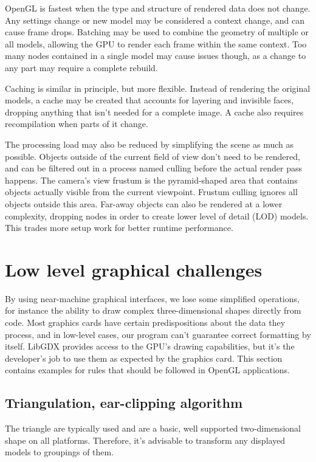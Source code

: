 OpenGL is fastest when the type and structure of rendered data does not change. Any settings change or new model may be considered a context change, and can cause frame drops. Batching may be used to combine the geometry of multiple or all models, allowing the GPU to render each frame within the same context. Too many nodes contained in a single model may cause issues though, as a change to any part may require a complete rebuild.

Caching is similar in principle, but more flexible. Instead of rendering the original models, a cache may be created that accounts for layering and invisible faces, dropping anything that isn't needed for a complete image. A cache also requires recompilation when parts of it change.

The processing load may also be reduced by simplifying the scene as much as possible. Objects outside of the current field of view don't need to be rendered, and can be filtered out in a process named culling before the actual render pass happens. The camera's view frustum is the pyramid-shaped area that contains objects actually visible from the current viewpoint. Frustum culling ignores all objects outside this area. Far-away objects can also be rendered at a lower complexity, dropping nodes in order to create lower level of detail (LOD) models. This trades more setup work for better runtime performance.

\section{Low level graphical challenges}

By using near-machine graphical interfaces, we lose some simplified operations, for instance the ability to draw complex three-dimensional shapes directly from code. Most graphics cards have certain predispositions about the data they process, and in low-level cases, our program can't guarantee correct formatting by itself. LibGDX provides access to the GPU's drawing capabilities, but it's the developer's job to use them as expected by the graphics card. This section contains examples for rules that should be followed in OpenGL applications.

\subsection{Triangulation, ear-clipping algorithm}

The triangle are typically used and are a basic, well supported two-dimensional shape on all platforms. Therefore, it's advisable to transform any displayed models to groupings of them.

